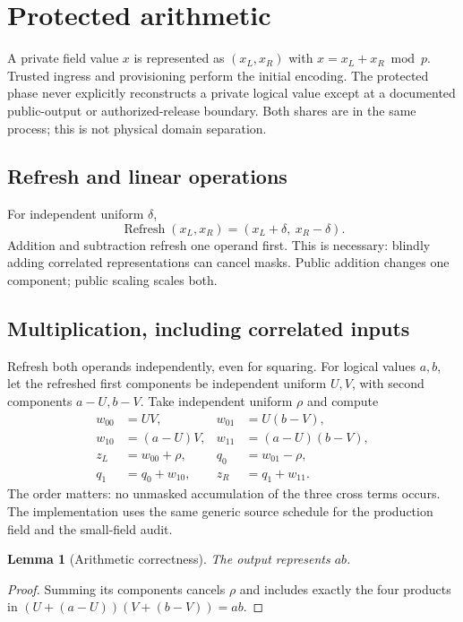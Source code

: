 \documentclass[11pt]{article}
\newtheorem{lemma}{Lemma}
\begin{document}
\section{Protected arithmetic}
A private field value $x$ is represented as $(x_L,x_R)$ with
$x=x_L+x_R\bmod p$. Trusted ingress and provisioning perform the initial
encoding. The protected phase never explicitly reconstructs a private
logical value except at a documented public-output or authorized-release
boundary. Both shares are in the same process; this is not physical
domain separation.

\subsection{Refresh and linear operations}
For independent uniform $\delta$,
\[
\operatorname{Refresh}(x_L,x_R)=
(x_L+\delta,\ x_R-\delta).
\]
Addition and subtraction refresh one operand first. This is necessary:
blindly adding correlated representations can cancel masks.
Public addition changes one component; public scaling scales both.

\subsection{Multiplication, including correlated inputs}
Refresh both operands independently, even for squaring. For logical values
$a,b$, let the refreshed first components be independent uniform $U,V$,
with second components $a-U,b-V$. Take independent uniform $\rho$ and compute
\begin{align*}
w_{00}&=UV,&w_{01}&=U(b-V),\\
w_{10}&=(a-U)V,&w_{11}&=(a-U)(b-V),\\
z_L&=w_{00}+\rho,&q_0&=w_{01}-\rho,\\
q_1&=q_0+w_{10},&z_R&=q_1+w_{11}.
\end{align*}
The order matters: no unmasked accumulation of the three cross terms occurs.
The implementation uses the same generic source schedule for the production
field and the small-field audit.

\begin{lemma}[Arithmetic correctness]
The output represents $ab$.
\end{lemma}
\begin{proof}
Summing its components cancels $\rho$ and includes exactly the four products
in $(U+(a-U))(V+(b-V))=ab$.
\end{proof}
\end{document}
